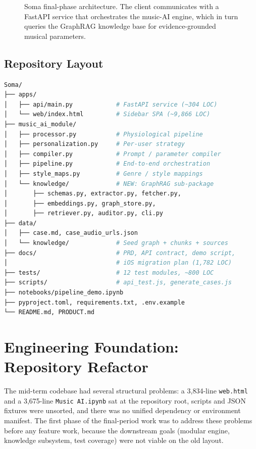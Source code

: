 \documentclass[11pt,a4paper]{article}
\begin{document}
\begin{figure}[h]
\caption{Soma final-phase architecture. The client communicates with a FastAPI
service that orchestrates the music-AI engine, which in turn queries the
GraphRAG knowledge base for evidence-grounded musical parameters.}
\label{fig:arch}
\end{figure}

\subsection{Repository Layout}

\begin{lstlisting}[language=bash, caption={Final-phase repository layout.}]
Soma/
├── apps/
│   ├── api/main.py            # FastAPI service (~304 LOC)
│   └── web/index.html         # Sidebar SPA (~9,866 LOC)
├── music_ai_module/
│   ├── processor.py           # Physiological pipeline
│   ├── personalization.py     # Per-user strategy
│   ├── compiler.py            # Prompt / parameter compiler
│   ├── pipeline.py            # End-to-end orchestration
│   ├── style_maps.py          # Genre / style mappings
│   └── knowledge/             # NEW: GraphRAG sub-package
│       ├── schemas.py, extractor.py, fetcher.py,
│       ├── embeddings.py, graph_store.py,
│       ├── retriever.py, auditor.py, cli.py
├── data/
│   ├── case.md, case_audio_urls.json
│   └── knowledge/             # Seed graph + chunks + sources
├── docs/                      # PRD, API contract, demo script,
│                              # iOS migration plan (1,782 LOC)
├── tests/                     # 12 test modules, ~800 LOC
├── scripts/                   # api_test.js, generate_cases.js
├── notebooks/pipeline_demo.ipynb
├── pyproject.toml, requirements.txt, .env.example
└── README.md, PRODUCT.md
\end{lstlisting}

\section{Engineering Foundation: Repository Refactor}

The mid-term codebase had several structural problems: a 3{,}834-line
\texttt{web.html} and a 3{,}675-line \texttt{Music AI.ipynb} sat at the
repository root, scripts and JSON fixtures were unsorted, and there was no
unified dependency or environment manifest. The first phase of the final-period
work was to address these problems before any feature work, because the
downstream goals (modular engine, knowledge subsystem, test coverage) were not
viable on the old layout.
\end{document}
